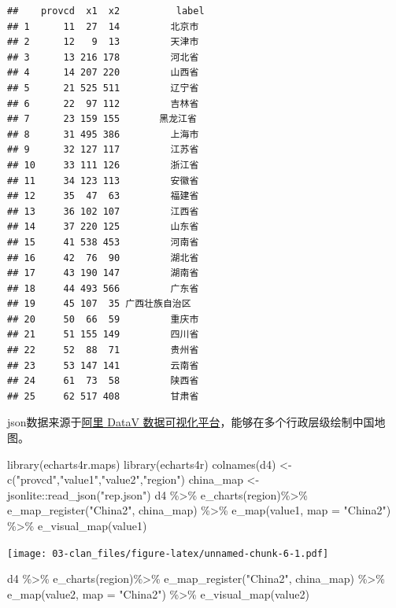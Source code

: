 \documentclass[
  oneside]{book}
\newenvironment{Shaded}{\begin{snugshade}}{\end{snugshade}}
\newcommand{\AttributeTok}[1]{\textcolor[rgb]{0.77,0.63,0.00}{#1}}
\newcommand{\FunctionTok}[1]{\textcolor[rgb]{0.00,0.00,0.00}{#1}}
\newcommand{\NormalTok}[1]{#1}
\newcommand{\OtherTok}[1]{\textcolor[rgb]{0.56,0.35,0.01}{#1}}
\newcommand{\SpecialCharTok}[1]{\textcolor[rgb]{0.00,0.00,0.00}{#1}}
\newcommand{\StringTok}[1]{\textcolor[rgb]{0.31,0.60,0.02}{#1}}
\begin{document}
\begin{verbatim}
##    provcd  x1  x2          label
## 1      11  27  14         北京市
## 2      12   9  13         天津市
## 3      13 216 178         河北省
## 4      14 207 220         山西省
## 5      21 525 511         辽宁省
## 6      22  97 112         吉林省
## 7      23 159 155       黑龙江省
## 8      31 495 386         上海市
## 9      32 127 117         江苏省
## 10     33 111 126         浙江省
## 11     34 123 113         安徽省
## 12     35  47  63         福建省
## 13     36 102 107         江西省
## 14     37 220 125         山东省
## 15     41 538 453         河南省
## 16     42  76  90         湖北省
## 17     43 190 147         湖南省
## 18     44 493 566         广东省
## 19     45 107  35 广西壮族自治区
## 20     50  66  59         重庆市
## 21     51 155 149         四川省
## 22     52  88  71         贵州省
## 23     53 147 141         云南省
## 24     61  73  58         陕西省
## 25     62 517 408         甘肃省
\end{verbatim}

json数据来源于\href{http://datav.aliyun.com/portal/school/atlas/area_selector}{阿里 DataV 数据可视化平台}，能够在多个行政层级绘制中国地图。

\begin{Shaded}
\begin{Highlighting}[]
\FunctionTok{library}\NormalTok{(echarts4r.maps)}
\FunctionTok{library}\NormalTok{(echarts4r)}
\FunctionTok{colnames}\NormalTok{(d4) }\OtherTok{\textless{}{-}} \FunctionTok{c}\NormalTok{(}\StringTok{"provcd"}\NormalTok{,}\StringTok{"value1"}\NormalTok{,}\StringTok{"value2"}\NormalTok{,}\StringTok{"region"}\NormalTok{)}
\NormalTok{china\_map }\OtherTok{\textless{}{-}}\NormalTok{ jsonlite}\SpecialCharTok{::}\FunctionTok{read\_json}\NormalTok{(}\StringTok{"rep.json"}\NormalTok{)}
\NormalTok{d4 }\SpecialCharTok{\%\textgreater{}\%}
  \FunctionTok{e\_charts}\NormalTok{(region)}\SpecialCharTok{\%\textgreater{}\%}
  \FunctionTok{e\_map\_register}\NormalTok{(}\StringTok{"China2"}\NormalTok{, china\_map) }\SpecialCharTok{\%\textgreater{}\%}
  \FunctionTok{e\_map}\NormalTok{(value1, }\AttributeTok{map =} \StringTok{"China2"}\NormalTok{) }\SpecialCharTok{\%\textgreater{}\%}
  \FunctionTok{e\_visual\_map}\NormalTok{(value1)}
\end{Highlighting}
\end{Shaded}

\texttt{[image: 03-clan\_files/figure-latex/unnamed-chunk-6-1.pdf]}

\begin{Shaded}
\begin{Highlighting}[]
\NormalTok{d4 }\SpecialCharTok{\%\textgreater{}\%}
  \FunctionTok{e\_charts}\NormalTok{(region)}\SpecialCharTok{\%\textgreater{}\%}
  \FunctionTok{e\_map\_register}\NormalTok{(}\StringTok{"China2"}\NormalTok{, china\_map) }\SpecialCharTok{\%\textgreater{}\%}
  \FunctionTok{e\_map}\NormalTok{(value2, }\AttributeTok{map =} \StringTok{"China2"}\NormalTok{) }\SpecialCharTok{\%\textgreater{}\%}
  \FunctionTok{e\_visual\_map}\NormalTok{(value2)}
\end{Highlighting}
\end{Shaded}
\end{document}
